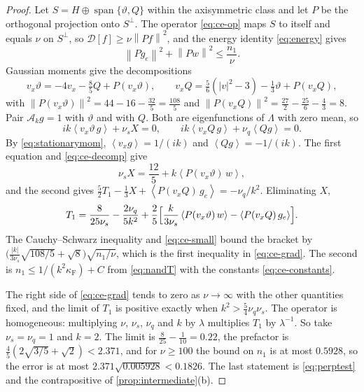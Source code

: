 \documentclass[11pt]{article}
\newcommand{\av}[1]{\left\langle #1\right\rangle}
\newcommand{\D}{\mathcal D}
\newcommand{\A}{\mathcal A}
\newcommand{\F}{\kappa_{\mathrm F}}
\newcommand{\norm}[1]{\left\|#1\right\|}
\theoremstyle{definition}
\theoremstyle{remark}
\numberwithin{equation}{section}
\begin{document}
\begin{proof}
Let $S=H\oplus\operatorname{span}\{\vartheta,Q\}$ within the axisymmetric
class and let $P$ be the orthogonal projection onto $S^\perp$. The
operator \eqref{eq:ce-op} maps $S$ to itself and equals $\nu$ on
$S^\perp$, so $\D[f]\geq\nu\norm{Pf}^2$, and the energy identity
\eqref{eq:energy} gives
\begin{equation}
 \norm{Pg_e}^2+\norm{Pw}^2\leq\frac{n_1}\nu .
 \label{eq:ce-small}
\end{equation}
Gaussian moments give the decompositions
\begin{equation}
 v_x\vartheta=-4v_x-\tfrac85Q+P(v_x\vartheta),\qquad
 v_xQ=\tfrac56(|v|^2-3)-\tfrac13\vartheta+P(v_xQ),
 \label{eq:ce-decomp}
\end{equation}
with $\norm{P(v_x\vartheta)}^2=44-16-\tfrac{32}5=\tfrac{108}5$ and
$\norm{P(v_xQ)}^2=\tfrac{27}2-\tfrac{25}6-\tfrac43=8$. Pair $\A_kg=1$
with $\vartheta$ and with $Q$. Both are eigenfunctions of $\Lambda$ with
zero mean, so
\[
 ik\av{v_x\vartheta\,g}+\nu_sX=0,\qquad
 ik\av{v_xQ\,g}+\nu_q\av{Qg}=0 .
\]
By \eqref{eq:stationarymom}, $\av{v_xg}=1/(ik)$ and $\av{Qg}=-1/(ik)$.
The first equation and \eqref{eq:ce-decomp} give
\[
 \nu_sX=\frac{12}5+k\av{P(v_x\vartheta)\,w},
\]
and the second gives
$\tfrac52T_1-\tfrac13X+\av{P(v_xQ)\,g_e}=-\nu_q/k^2$. Eliminating $X$,
\[
 T_1=\frac8{25\nu_s}-\frac{2\nu_q}{5k^2}
     +\frac25\Bigl[\frac{k}{3\nu_s}\av{P(v_x\vartheta)\,w}
       -\av{P(v_xQ)\,g_e}\Bigr].
\]
The Cauchy--Schwarz inequality and \eqref{eq:ce-small} bound the bracket
by $\bigl(\tfrac{|k|}{3\nu_s}\sqrt{108/5}+\sqrt8\bigr)\sqrt{n_1/\nu}$, which
is the first inequality in \eqref{eq:ce-grad}. The second is
$n_1\leq1/(k^2\F)+C$ from \eqref{eq:nandT} with the constants
\eqref{eq:ce-constants}.

The right side of \eqref{eq:ce-grad} tends to zero as $\nu\to\infty$ with
the other quantities fixed, and the limit of $T_1$ is positive exactly
when $k^2>\tfrac54\nu_q\nu_s$. The operator is homogeneous: multiplying
$\nu$, $\nu_s$, $\nu_q$ and $k$ by $\lambda$ multiplies $T_1$ by
$\lambda^{-1}$. So take $\nu_s=\nu_q=1$ and $k=2$. The limit is
$\tfrac8{25}-\tfrac1{10}=0.22$, the prefactor is
$\tfrac45(2\sqrt{3/5}+\sqrt2)<2.371$, and for $\nu\geq100$ the bound on
$n_1$ is at most $0.5928$, so the error is at most
$2.371\sqrt{0.005928}<0.1826$. The last statement is \eqref{eq:perptest}
and the contrapositive of \cref{prop:intermediate}(b).
\end{proof}
\end{document}
